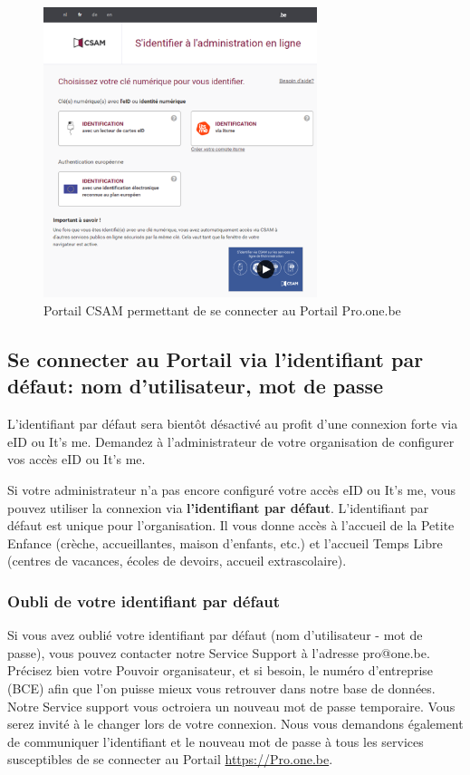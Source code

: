\begin{figure}
    \centering
    \includegraphics[width=8cm]{Images/intro/csam.png}
    \caption{Portail CSAM permettant de se connecter au Portail Pro.one.be}
    \label{fig:CSAM_portal}
\end{figure}


\subsection*{Se connecter au Portail via l'identifiant par défaut: nom d'utilisateur, mot de passe}

\begin{attention}
L'identifiant par défaut sera bientôt \textcolor{rouge}{désactivé} au profit d'une connexion forte via eID ou It's me. Demandez à l'administrateur de votre organisation de configurer vos accès eID ou It's me.  
\end{attention}

Si votre administrateur n'a pas encore configuré votre accès eID ou It's me, vous pouvez utiliser la connexion via \textbf{l'identifiant par défaut}. L'identifiant par défaut est unique pour l'organisation. Il vous donne accès à l'accueil de la Petite Enfance (crèche, accueillantes, maison d'enfants, etc.) et l'accueil Temps Libre (centres de vacances, écoles de devoirs, accueil extrascolaire).

\subsubsection{Oubli de votre identifiant par défaut}
Si vous avez oublié votre identifiant par défaut (nom d'utilisateur - mot de passe), vous pouvez contacter notre Service Support à l'adresse pro@one.be. Précisez bien votre Pouvoir organisateur, et si besoin, le numéro d'entreprise (BCE) afin que l'on puisse mieux vous retrouver dans notre base de données. Notre Service support vous octroiera un nouveau mot de passe temporaire. Vous serez invité à le changer lors de votre connexion. Nous vous demandons également de communiquer l'identifiant et le nouveau mot de passe à tous les services susceptibles de se connecter au Portail \url{https://Pro.one.be}. 

